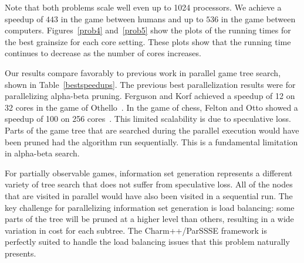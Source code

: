 \documentclass[times, 10pt,twocolumn]{article}
\begin{document}
Note that both problems scale well even up to 1024 processors.  We achieve a speedup of $443$ in the game between humans and up to $536$ in the game between computers.  Figures~\ref{prob4} and~\ref{prob5} show the plots of the running times for the best grainsize for each core setting.  These plots show that the running time continues to decrease as the number of cores increases.

Our results compare favorably to previous work in parallel game tree search, shown in Table~\ref{bestspeedups}.  The previous best parallelization results were for parallelizing alpha-beta pruning.  Ferguson and Korf achieved a speedup of 12 on 32 cores in the game of Othello~\cite{ferguson88distributed}.  In the game of chess, Felton and Otto showed a speedup of 100 on 256 cores~\cite{felten88highly}.  This limited scalability is due to speculative loss.  Parts of the game tree that are searched during the parallel execution would have been pruned had the algorithm run sequentially.  This is a fundamental limitation in alpha-beta search. 

For partially observable games, information set generation represents a different variety of tree search that does not suffer from speculative loss.  All of the nodes that are visited in parallel would have also been visited in a sequential run.  The key challenge for parallelizing information set generation is load balancing: some parts of the tree will be pruned at a higher level than others, resulting in a wide variation in cost for each subtree.  The {\sc Charm++/ParSSSE} framework is perfectly suited to handle the load balancing issues that this problem naturally presents.
\end{document}
